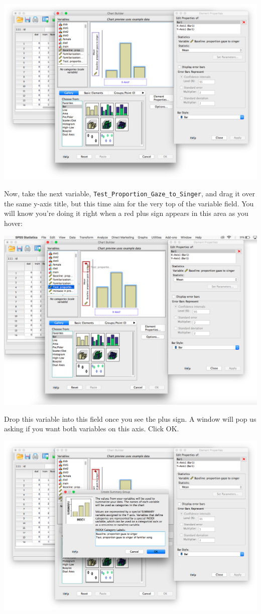 \documentclass[
]{book}
\begin{document}
\includegraphics{img/6.4.24.png}

Now, take the next variable, \texttt{Test\_Proportion\_Gaze\_to\_Singer}, and drag it over the same y-axis title, but this time aim for the very top of the variable field. You will know you're doing it right when a red plus sign appears in this area as you hover:

\includegraphics{img/6.4.25.png}

Drop this variable into this field once you see the plus sign. A window will pop us asking if you want both variables on this axis. {Click OK}.

\includegraphics{img/6.4.26.png}
\end{document}

